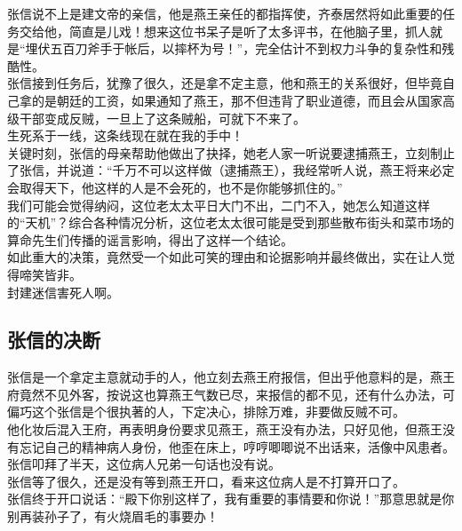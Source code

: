 \begin{multicols}{\theparacolNo}
张信说不上是建文帝的亲信，他是燕王亲任的都指挥使，齐泰居然将如此重要的任务交给他，简直是儿戏！想来这位书呆子是听了太多评书，在他脑子里，抓人就是“埋伏五百刀斧手于帐后，以摔杯为号！”，完全估计不到权力斗争的复杂性和残酷性。\\

张信接到任务后，犹豫了很久，还是拿不定主意，他和燕王的关系很好，但毕竟自己拿的是朝廷的工资，如果通知了燕王，那不但违背了职业道德，而且会从国家高级干部变成反贼，一旦上了这条贼船，可就下不来了。\\

生死系于一线，这条线现在就在我的手中！\\

关键时刻，张信的母亲帮助他做出了抉择，她老人家一听说要逮捕燕王，立刻制止了张信，并说道：“千万不可以这样做（逮捕燕王），我经常听人说，燕王将来必定会取得天下，他这样的人是不会死的，也不是你能够抓住的。”\\

我们可能会觉得纳闷，这位老太太平日大门不出，二门不入，她怎么知道这样的“天机”？综合各种情况分析，这位老太太很可能是受到那些散布街头和菜市场的算命先生们传播的谣言影响，得出了这样一个结论。\\

如此重大的决策，竟然受一个如此可笑的理由和论据影响并最终做出，实在让人觉得啼笑皆非。\\

封建迷信害死人啊。\\

\subsection{张信的决断}
张信是一个拿定主意就动手的人，他立刻去燕王府报信，但出乎他意料的是，燕王府竟然不见外客，按说这也算燕王气数已尽，来报信的都不见，还有什么办法，可偏巧这个张信是个很执著的人，下定决心，排除万难，非要做反贼不可。\\

他化妆后混入王府，再表明身份要求见燕王，燕王没有办法，只好见他，但燕王没有忘记自己的精神病人身份，他歪在床上，哼哼唧唧说不出话来，活像中风患者。张信叩拜了半天，这位病人兄弟一句话也没有说。\\

张信等了很久，还是没有等到燕王开口，看来这位病人是不打算开口了。\\

张信终于开口说话：“殿下你别这样了，我有重要的事情要和你说！”那意思就是你别再装孙子了，有火烧眉毛的事要办！\\


\end{multicols}
